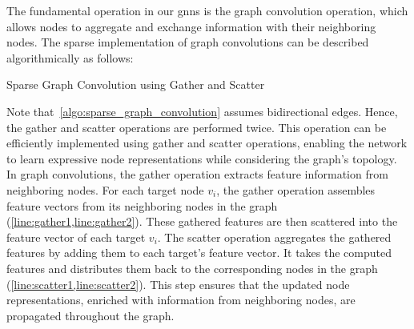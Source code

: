 The fundamental operation in our \acp{gnn} is the graph convolution operation, which allows nodes to aggregate and exchange information with their neighboring nodes.
The sparse implementation of graph convolutions can be described algorithmically as follows:
\begin{algorithm}[H]
    \caption{Sparse Graph Convolution using Gather and Scatter}\label{algo:sparse_graph_convolution}
    \begin{algorithmic}[1]
         \label{line:gather1}
         \label{line:gather2}
          \label{line:scatter1}
          \label{line:scatter2}
         \label{line:sum}
         \label{line:res}
        \EndFunction{}
    \end{algorithmic}
\end{algorithm}
Note that~\cref{algo:sparse_graph_convolution} assumes bidirectional edges. Hence, the gather and scatter operations are performed twice.
This operation can be efficiently implemented using gather and scatter operations, enabling the network to learn expressive node representations while considering the graph's topology.
In graph convolutions, the gather operation extracts feature information from neighboring nodes.
For each target node $v_{i}$, the gather operation assembles feature vectors from its neighboring nodes in the graph (\cref{line:gather1,line:gather2}).
These gathered features are then scattered into the feature vector of each target $v_{i}$.
The scatter operation aggregates the gathered features by adding them to each target's feature vector.
It takes the computed features and distributes them back to the corresponding nodes in the graph (\cref{line:scatter1,line:scatter2}).
This step ensures that the updated node representations, enriched with information from neighboring nodes, are propagated throughout the graph.

